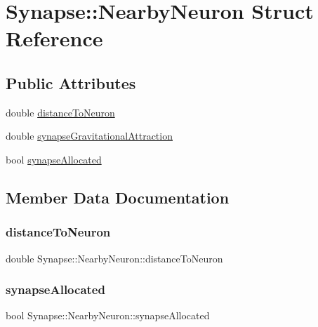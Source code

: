 \hypertarget{structSynapse_1_1NearbyNeuron}{}\section{Synapse\+:\+:Nearby\+Neuron Struct Reference}
\label{structSynapse_1_1NearbyNeuron}
\subsection*{Public Attributes}
\begin{DoxyCompactItemize}
\item 
double \mbox{\hyperlink{structSynapse_1_1NearbyNeuron_a11322181215d2b2d3ef360fa212badb9}{distance\+To\+Neuron}}
\item 
double \mbox{\hyperlink{structSynapse_1_1NearbyNeuron_ad81c00ed7d53310fa94f44e1e3fffc77}{synapse\+Gravitational\+Attraction}}
\item 
bool \mbox{\hyperlink{structSynapse_1_1NearbyNeuron_a211af29e29f4c2cfeb221b45d594d047}{synapse\+Allocated}}
\end{DoxyCompactItemize}


\subsection{Member Data Documentation}
\mbox{\label{structSynapse_1_1NearbyNeuron_a11322181215d2b2d3ef360fa212badb9}} 
\subsubsection{\texorpdfstring{distance\+To\+Neuron}{distanceToNeuron}}
{\footnotesize\ttfamily double Synapse\+::\+Nearby\+Neuron\+::distance\+To\+Neuron}

\mbox{\label{structSynapse_1_1NearbyNeuron_a211af29e29f4c2cfeb221b45d594d047}} 
\subsubsection{\texorpdfstring{synapse\+Allocated}{synapseAllocated}}
{\footnotesize\ttfamily bool Synapse\+::\+Nearby\+Neuron\+::synapse\+Allocated}

